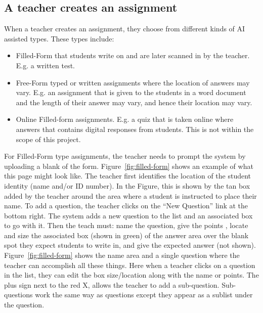 \documentclass[ms,twoside,print]{nuthesis}
\begin{document}
\subsection{A teacher creates an assignment}

When a teacher creates an assignment, they choose from different kinds of AI assisted types. These types include:

\begin{itemize}
    \item Filled-Form that students write on and are later scanned in by the teacher. E.g. a written test. 
    \item Free-Form typed or written assignments where the location of answers may vary. E.g. an assignment that is given to the students in a word document and the length of their answer may vary, and hence their location may vary.
    \item Online Filled-form assignments. E.g. a quiz that is taken online where answers that contains digital responses from students. This is not within the scope of this project.
\end{itemize}

For Filled-Form type assignments, the teacher needs to prompt the system by uploading a blank of the form. Figure~\ref{fig:filled-form} shows an example of what this page might look like. The teacher first identifies the location of the student identity (name and/or ID number). In the Figure, this is shown by the tan box added by the teacher around the area where a student is instructed to place their name. To add a question, the teacher clicks on the ``New Question'' link at the bottom right. The system adds a new question to the list and an associated box to go with it. Then the teach must: name the question, give the points , locate and size the associated box (shown in green) of the answer area over the blank spot they expect students to write in, and give the expected answer (not shown). Figure~\ref{fig:filled-form} shows the name area and a single question where the teacher can accomplish all these things. Here when a teacher clicks on a question in the list, they can edit the box size/location along with the name or points. The plus sign next to the red X, allows the teacher to add a sub-question. Sub-questions work the same way as questions except they appear as a sublist under the question.
\end{document}
